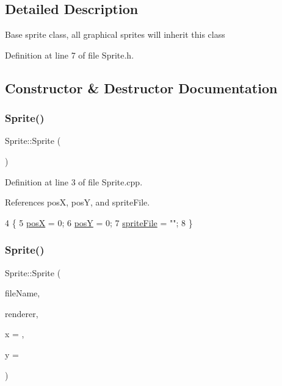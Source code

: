 \subsection{Detailed Description}
Base sprite class, all graphical sprites will inherit this class 

Definition at line 7 of file Sprite.\+h.



\subsection{Constructor \& Destructor Documentation}
\mbox{\label{class_sprite_a12cba3ac1868418add3c4d95ce87e615}} 
\subsubsection{\texorpdfstring{Sprite()}{Sprite()}\hspace{0.1cm}{\footnotesize\ttfamily [1/2]}}
{\footnotesize\ttfamily Sprite\+::\+Sprite (\begin{DoxyParamCaption}{ }\end{DoxyParamCaption})}



Definition at line 3 of file Sprite.\+cpp.



References posX, posY, and sprite\+File.


\begin{DoxyCode}
4 \{
5     \hyperlink{class_sprite_a0af496e3e6540f1f1321913a741a737a}{posX} = 0;
6     \hyperlink{class_sprite_a1ef80a5eff9d5b0bb90ae355daf09efe}{posY} = 0;
7     \hyperlink{class_sprite_a595ffe434aadbc94b9abd272c0356c9d}{spriteFile} = \textcolor{stringliteral}{""};
8 \}
\end{DoxyCode}
\mbox{\label{class_sprite_a9e4b47480afc64a0969d2b9014af02cc}} 
\subsubsection{\texorpdfstring{Sprite()}{Sprite()}\hspace{0.1cm}{\footnotesize\ttfamily [2/2]}}
{\footnotesize\ttfamily Sprite\+::\+Sprite (\begin{DoxyParamCaption}\item[{std\+::string}]{file\+Name,  }\item[{S\+D\+L\+\_\+\+Renderer $\ast$}]{renderer,  }\item[{int}]{x = {},  }\item[{int}]{y = {} }\end{DoxyParamCaption})}




